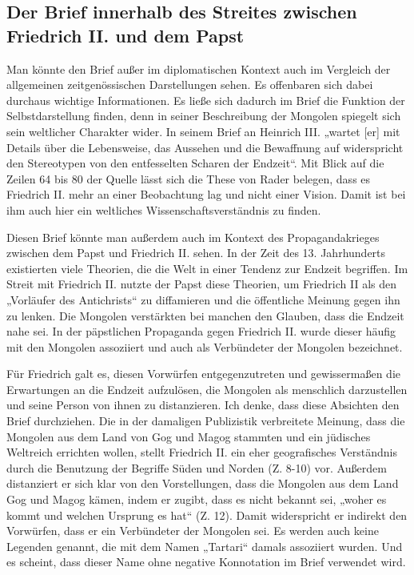 \documentclass[12pt,headsepline,a4paper]{scrartcl}
\begin{document}
\subsection{Der Brief innerhalb des Streites zwischen Friedrich II. und dem Papst}
Man könnte den Brief außer im diplomatischen Kontext auch im Vergleich der
allgemeinen zeitgenössischen Darstellungen sehen. Es offenbaren sich dabei durchaus
wichtige Informationen. Es ließe sich dadurch im Brief die Funktion der
Selbstdarstellung finden, denn in seiner Beschreibung der Mongolen spiegelt sich sein
weltlicher Charakter wider. In seinem Brief an Heinrich III. „wartet [er] mit Details über
die Lebensweise, das Aussehen und die Bewaffnung auf widerspricht den Stereotypen
von den entfesselten Scharen der Endzeit“\autocite[470]{rader2010}. Mit Blick auf die Zeilen 64 bis 80 der
Quelle lässt sich die These von Rader\autocite[470]{rader2010} belegen, dass es Friedrich II. mehr an
einer Beobachtung lag und nicht einer Vision. Damit ist bei ihm auch hier ein weltliches
Wissenschaftsverständnis zu finden.

Diesen Brief könnte man außerdem auch im Kontext des Propagandakrieges
zwischen dem Papst und Friedrich II. sehen. In der Zeit des 13. Jahrhunderts existierten
viele Theorien, die die Welt in einer Tendenz zur Endzeit begriffen. Im Streit mit
Friedrich II. nutzte der Papst diese Theorien, um Friedrich II als den „Vorläufer des
Antichrists“\autocite[69]{schaller1998} zu diffamieren und die öffentliche Meinung gegen ihn zu lenken. Die
Mongolen verstärkten bei manchen den Glauben, dass die Endzeit nahe sei. In der
päpstlichen Propaganda gegen Friedrich II. wurde dieser häufig mit den Mongolen
assoziiert und auch als Verbündeter der Mongolen bezeichnet.\autocite[469]{rader2010}

Für Friedrich galt es, diesen Vorwürfen entgegenzutreten und gewissermaßen die
Erwartungen an die Endzeit aufzulösen, die Mongolen als menschlich darzustellen und
seine Person von ihnen zu distanzieren. Ich denke, dass diese Absichten den Brief
durchziehen. Die in der damaligen Publizistik verbreitete Meinung, dass die Mongolen
aus dem Land von Gog und Magog stammten und ein jüdisches Weltreich errichten
wollen, stellt Friedrich II. ein eher geografisches Verständnis durch die Benutzung der
Begriffe Süden und Norden (Z. 8-10) vor. Außerdem distanziert er sich klar von den
Vorstellungen, dass die Mongolen aus dem Land Gog und Magog kämen, indem er
zugibt, dass es nicht bekannt sei, „woher es kommt und welchen Ursprung es hat“ (Z.
12). Damit widerspricht er indirekt den Vorwürfen, dass er ein Verbündeter der
Mongolen sei. Es werden auch keine Legenden genannt, die mit dem Namen „Tartari“
damals assoziiert wurden. Und es scheint, dass dieser Name ohne negative Konnotation
im Brief verwendet wird.
\end{document}
